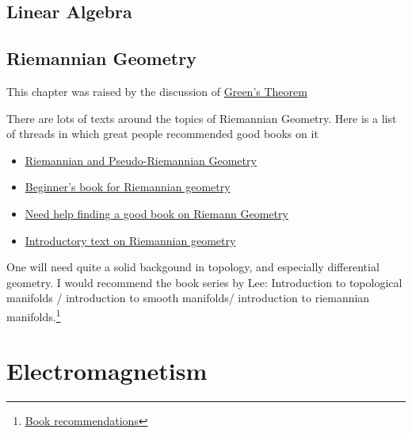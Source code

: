     
    \chapter{Linear Algebra}
    
    \chapter{Riemannian Geometry}
    \label{ch:riemannian-geometry}
    This chapter was raised by the discussion of \hyperlink{green-theorem-proof}{Green's Theorem}

    There are lots of texts around the topics of Riemannian Geometry. Here is a list of threads in which great people
    recommended good books on it

    \begin{itemize}
        \item \href{https://physics.stackexchange.com/a/247415}{Riemannian and Pseudo-Riemannian Geometry}
        \item \href{https://math.stackexchange.com/questions/1546037/beginners-book-for-riemannian-geometry}{Beginner's book for Riemannian geometry}
        \item \href{https://math.stackexchange.com/questions/499945/need-help-finding-a-good-book-on-riemann-geometry}{Need help finding a good book on Riemann Geometry}
        \item \href{https://mathoverflow.net/questions/19505/introductory-text-on-riemannian-geometry}{Introductory text on Riemannian geometry}
    \end{itemize}

    One will need quite a solid backgound in topology, and especially differential geometry. I would recommend the book
    series by Lee: Introduction to topological manifolds / introduction to smooth manifolds/ introduction to riemannian
    manifolds.\footnote{\href{https://www.reddit.com/r/math/comments/tt2klk/comment/i2v4nud/?utm\_source=share\&utm\_medium=web3x\&utm\_name=web3xcss\&utm\_term=1\&utm\_content=share\_button}{Book recommendations}}


    

    \part{Electromagnetism}

